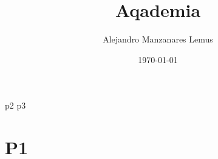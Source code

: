 \documentclass[10pt]{report}
\author{Alejandro Manzanares Lemus}
\title{Aqademia}
\date{\today}
\begin{document}
            {p2}
            {p3}

\tableofcontents


\chapter{P1}


\end{document}
